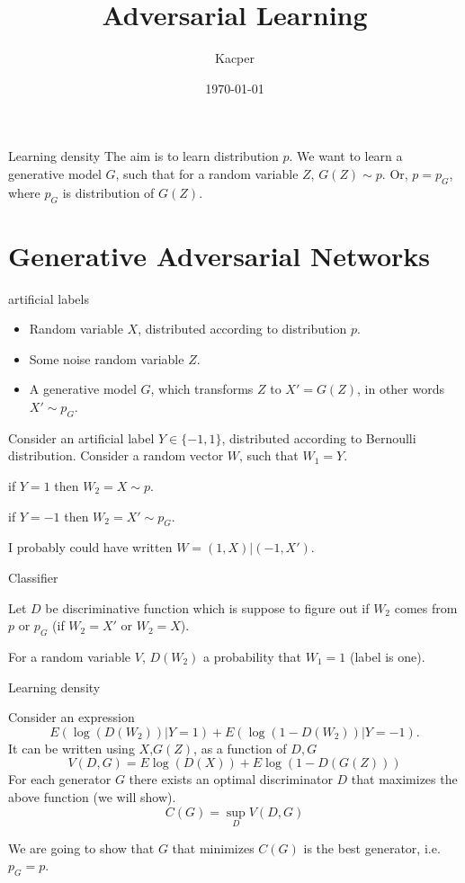 \documentclass{beamer}
\title{ Adversarial Learning}
\date{\today}
\author{Kacper}
\institute{}
\begin{document}
  \maketitle
  
  
  
\begin{frame}{Learning density}
The aim is to learn distribution $p$.
We want to  learn a generative model $G$, such that for a random variable $Z$, $G(Z) \sim p$.
Or, $p = p_G$, where $p_G$ is distribution of $G(Z)$.
\end{frame}
  
\section{Generative Adversarial Networks}
  
\begin{frame}{artificial  labels}
  \begin{itemize}
   \item Random variable  $X$, distributed according to distribution $p$. 
   \item Some noise random variable $Z$.
   \item A generative model $G$, which transforms $Z$ to $X' = G(Z)$, in other words  $X' \sim p_{G}$.
\end{itemize}

Consider an artificial  label   $Y \in \{ -1,1 \}$, distributed according to Bernoulli distribution. 
Consider a random vector $W$, such that $W_1 = Y$.  

if $Y=1$  then  $W_2 =X \sim p$.

if $Y=-1$  then $W_2 =X' \sim p_G$.

I probably could have written $W  = (1,X) | (-1,X')$.

\end{frame}
  
  
   
\begin{frame}{Classifier}

Let $D$ be discriminative function which is suppose to figure out if $W_2$ comes from $p$ or $p_G$ (if $W_2 = X'$ or $W_2=X$). 

For a random variable  $V$,  $D(W_2)$ a probability that $W_1 =1$ (label is one).  

\end{frame}
  
  
  
  
\begin{frame}{Learning density}

Consider an expression  
$$
E \left( \log(D(W_2)) | Y=1 \right)  + E \left( \log(1 - D(W_2))| Y=-1  \right).
$$
It can be written using $X$,$G(Z)$, as a function of $D,G$
$$
V(D,G) = E \log(D(X)) + E \log(1 - D(G(Z)))
$$
For each generator  $G$ there exists an optimal  discriminator $D$ that maximizes the above function (we will show). 
$$C(G) = \sup_{D} V(D,G)$$

We are going to show that $G$ that minimizes $C(G)$ is the best generator, i.e. $p_G = p$.
\end{frame}
  
\end{document}
